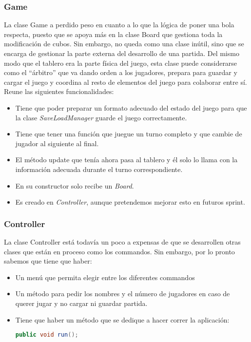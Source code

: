 \documentclass{article}
\begin{document}
\subsubsection*{Game}
La clase Game a perdido peso en cuanto a lo que la lógica de poner una bola respecta, puesto que se apoya más en la clase Board que gestiona toda la modificación de cubos. Sin embargo, no queda como una clase inútil, sino que se encarga de gestionar la parte externa del desarrollo de una partida. Del mismo modo que el tablero era la parte física del juego, esta clase puede considerarse como el ``árbitro'' que va dando orden a los jugadores, prepara para guardar y cargar el juego y coordina al resto de elementos del juego para colaborar entre sí. Reune las siguientes funcionalidades:
\begin{itemize}
\item Tiene que poder preparar un formato adecuado del estado del juego para que la clase \textit{SaveLoadManager} guarde el juego correctamente.
\item Tiene que tener una función que juegue un turno completo y que cambie de jugador al siguiente al final.
\item El método update que tenía ahora pasa al tablero y él solo lo llama con la información adecuada durante el turno correspondiente.
\item En su constructor solo recibe un \textit{Board}.
\item Es creado en \textit{Controller}, aunque pretendemos mejorar esto en futuros sprint.
\end{itemize}

\subsubsection*{Controller}
La clase Controller está todavía un poco a expensas de que se desarrollen otras clases que están en proceso como los commandos. Sin embargo, por lo pronto sabemos que tiene que haber:
\begin{itemize}
\item Un menú que permita elegir entre los diferentes commandos
\item Un método para pedir los nombres y el número de jugadores en caso de querer jugar y no cargar ni guardar partida.
\item Tiene que haber un método que se dedique a hacer correr la aplicación:
\begin{lstlisting}[language=Java]
public void run();
\end{lstlisting}
\end{itemize}
\end{document}
